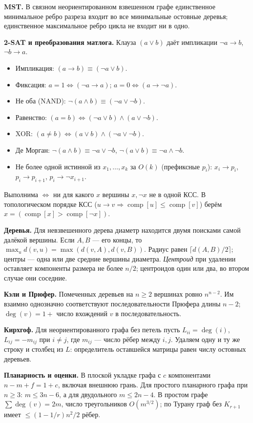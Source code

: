 \textbf{MST.} В связном неориентированном взвешенном графе единственное минимальное ребро разреза входит во все минимальные остовные деревья; единственное максимальное ребро цикла не входит ни в одно.

\textbf{2-SAT и преобразования матлога.} Клауза $(a\lor b)$ даёт импликации $\neg a\to b$, $\neg b\to a$.
\begin{itemize}
  \item Импликация: $(a\to b)\equiv(\neg a\lor b)$.
  \item Фиксация: $a=1\iff(\neg a\to a)$; $a=0\iff(a\to\neg a)$.
  \item Не оба (NAND): $\neg(a\land b)\equiv(\neg a\lor\neg b)$.
  \item Равенство: $(a=b)\iff(\neg a\lor b)\land(a\lor\neg b)$.
  \item XOR: $(a\ne b)\iff(a\lor b)\land(\neg a\lor\neg b)$.
  \item Де Морган: $\neg(a\land b)\equiv\neg a\lor\neg b$, $\neg(a\lor b)\equiv\neg a\land\neg b$.
  \item Не более одной истинной из $x_1,\dots,x_k$ за $O(k)$ (префиксные $p_i$): $x_i\to p_i$, $p_i\to p_{i+1}$, $p_i\to\neg x_{i+1}$.
\end{itemize}
Выполнима $\iff$ ни для какого $x$ вершины $x,\neg x$ не в одной КСС. В топологическом порядке КСС ($u\to v\Rightarrow\operatorname{comp}[u]\le\operatorname{comp}[v]$) берём $x=(\operatorname{comp}[x]>\operatorname{comp}[\neg x])$.

\textbf{Деревья.} Для невзвешенного дерева диаметр находится двумя поисками самой далёкой вершины. Если $A,B$ --- его концы, то
$\max_u d(v,u)=\max(d(v,A),d(v,B))$.
Радиус равен $\lceil d(A,B)/2\rceil$; центры --- одна или две средние вершины диаметра.
\emph{Центроид} при удалении оставляет компоненты размера не более $n/2$; центроидов один или два, во втором случае они соседние.

\textbf{Кэли и Прюфер.} Помеченных деревьев на $n\ge2$ вершинах ровно $n^{n-2}$. Им взаимно однозначно соответствуют последовательности Прюфера длины $n-2$; $\deg(v)=1+$ число вхождений $v$ в последовательность.

\textbf{Кирхгоф.} Для неориентированного графа без петель пусть $L_{ii}=\deg(i)$, $L_{ij}=-m_{ij}$ при $i\ne j$, где $m_{ij}$ --- число рёбер между $i,j$. Удаляем одну и ту же строку и столбец из $L$: определитель оставшейся матрицы равен числу остовных деревьев.

\textbf{Планарность и оценки.} В плоской укладке графа с $c$ компонентами $n-m+f=1+c$, включая внешнюю грань. Для простого планарного графа при $n\ge3$: $m\le3n-6$, а для двудольного $m\le2n-4$.
В простом графе $\sum\deg(v)=2m$, число треугольников $O(m^{3/2})$; по Турану граф без $K_{r+1}$ имеет $\le(1-1/r)n^2/2$ рёбер.

